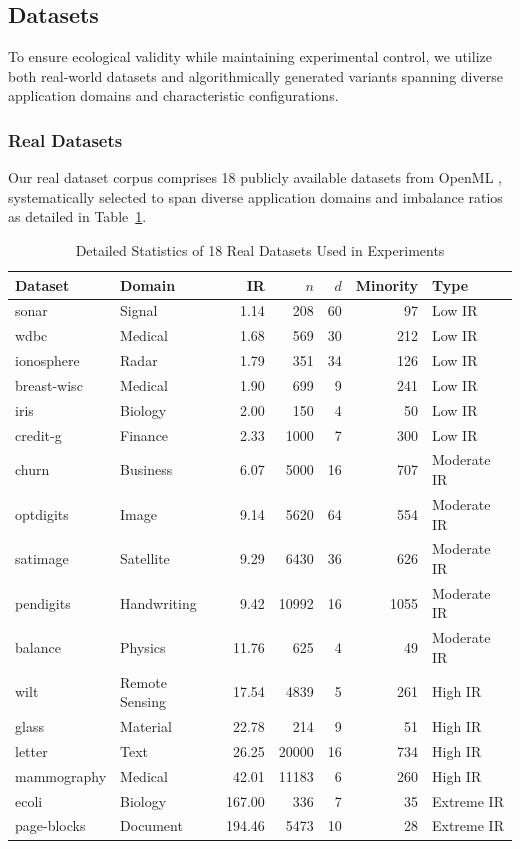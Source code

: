 \documentclass{ijSmartGrid}
\theoremstyle{definition}
\begin{document}
\subsection{Datasets}
\indent To ensure ecological validity while maintaining experimental control, we utilize both real-world datasets and algorithmically generated variants spanning diverse application domains and characteristic configurations.

\subsubsection{Real Datasets}
\indent Our real dataset corpus comprises 18 publicly available datasets from OpenML \cite{OpenML2013}, systematically selected to span diverse application domains and imbalance ratios as detailed in Table~\ref{tab:datasets}.

\begin{table}[!ht]
  \centering
  \caption{Detailed Statistics of 18 Real Datasets Used in Experiments}
  \label{tab:datasets}
  \small
  \begin{tabular}{llrrrrl}
    \toprule
    \textbf{Dataset} & \textbf{Domain} & \textbf{IR} & \textbf{$n$} & \textbf{$d$} & \textbf{Minority} & \textbf{Type} \\
    \midrule
    sonar & Signal & 1.14 & 208 & 60 & 97 & Low IR \\
    wdbc & Medical & 1.68 & 569 & 30 & 212 & Low IR \\
    ionosphere & Radar & 1.79 & 351 & 34 & 126 & Low IR \\
    breast-wisc & Medical & 1.90 & 699 & 9 & 241 & Low IR \\
    iris & Biology & 2.00 & 150 & 4 & 50 & Low IR \\
    credit-g & Finance & 2.33 & 1000 & 7 & 300 & Low IR \\
    \midrule
    churn & Business & 6.07 & 5000 & 16 & 707 & Moderate IR \\
    optdigits & Image & 9.14 & 5620 & 64 & 554 & Moderate IR \\
    satimage & Satellite & 9.29 & 6430 & 36 & 626 & Moderate IR \\
    pendigits & Handwriting & 9.42 & 10992 & 16 & 1055 & Moderate IR \\
    balance & Physics & 11.76 & 625 & 4 & 49 & Moderate IR \\
    \midrule
    wilt & Remote Sensing & 17.54 & 4839 & 5 & 261 & High IR \\
    glass & Material & 22.78 & 214 & 9 & 51 & High IR \\
    letter & Text & 26.25 & 20000 & 16 & 734 & High IR \\
    mammography & Medical & 42.01 & 11183 & 6 & 260 & High IR \\
    \midrule
    ecoli & Biology & 167.00 & 336 & 7 & 35 & Extreme IR \\
    page-blocks & Document & 194.46 & 5473 & 10 & 28 & Extreme IR \\
    \bottomrule
  \end{tabular}
\end{table}
\end{document}
